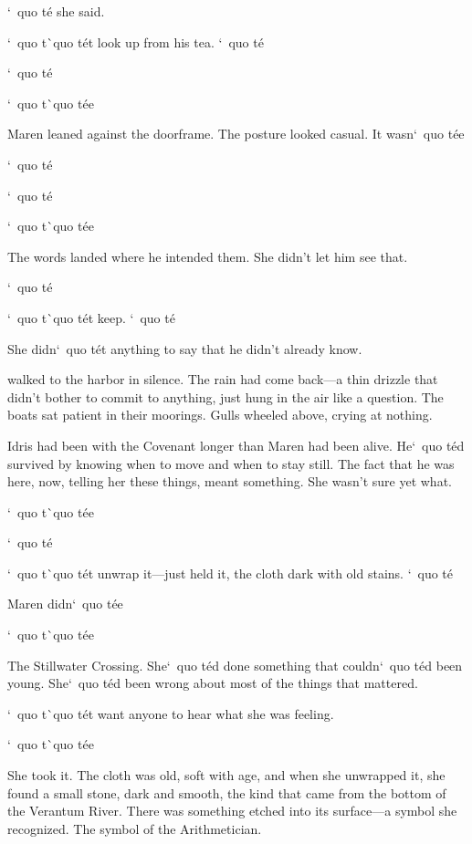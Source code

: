 \documentclass[12pt,letterpaper,openany]{book}
\begin{document}
\par
`\ quo t\'e{} she said.
\par
`\ quo t\`\ quo t\'e{}t look up from his tea. `\ quo t\'e{}
\par
`\ quo t\'e{}
\par
`\ quo t\`\ quo t\'e{}e{}
\par
Maren leaned against the doorframe. The posture looked casual. It wasn`\ quo t\'e{}e{}
\par
`\ quo t\'e{}
\par
`\ quo t\'e{}
\par
`\ quo t\`\ quo t\'e{}e{}
\par
The words landed where he intended them. She didn't let him see that.
\par
`\ quo t\'e{}
\par
`\ quo t\`\ quo t\'e{}t keep. `\ quo t\'e{}
\par
She didn`\ quo t\'e{}t anything to say that he didn't already know.
\par
\hrulefillThey walked to the harbor in silence. The rain had come back—a thin drizzle that didn't bother to commit to anything, just hung in the air like a question. The boats sat patient in their moorings. Gulls wheeled above, crying at nothing.
\par
Idris had been with the Covenant longer than Maren had been alive. He`\ quo t\'e{}d survived by knowing when to move and when to stay still. The fact that he was here, now, telling her these things, meant something. She wasn't sure yet what.
\par
`\ quo t\`\ quo t\'e{}e{}
\par
`\ quo t\'e{}
\par
`\ quo t\`\ quo t\'e{}t unwrap it—just held it, the cloth dark with old stains. `\ quo t\'e{}
\par
Maren didn`\ quo t\'e{}e{}
\par
`\ quo t\`\ quo t\'e{}e{}
\par
The Stillwater Crossing. She`\ quo t\'e{}d done something that couldn`\ quo t\'e{}d been young. She`\ quo t\'e{}d been wrong about most of the things that mattered.
\par
`\ quo t\`\ quo t\'e{}t want anyone to hear what she was feeling.
\par
`\ quo t\`\ quo t\'e{}e{}
\par
She took it. The cloth was old, soft with age, and when she unwrapped it, she found a small stone, dark and smooth, the kind that came from the bottom of the Verantum River. There was something etched into its surface—a symbol she recognized. The symbol of the Arithmetician.
\end{document}
